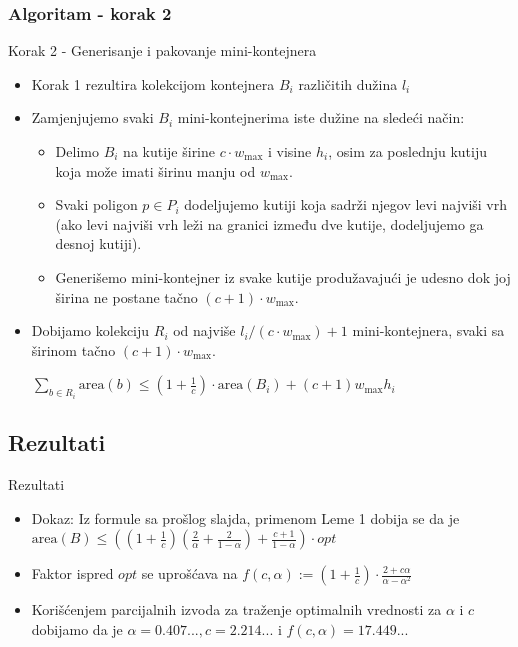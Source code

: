 \documentclass{beamer}
\theoremstyle{plain}
\newcommand{\thistheoremname}{}
\newtheorem{genericthm}[thm]{\thistheoremname}
\newenvironment{namedthm}[1]
  {\renewcommand{\thistheoremname}{#1}%
   \begin{genericthm}}
  {\end{genericthm}}
\begin{document}
\subsubsection{Algoritam - korak 2}
\begin{frame}{Korak 2 - Generisanje i pakovanje mini-kontejnera}
\begin{itemize}
    \item Korak 1 rezultira kolekcijom kontejnera $B_i$ različitih dužina $l_i$
    \item Zamjenjujemo svaki $B_i$ mini-kontejnerima iste dužine na sledeći način:
      \begin{itemize}
        \item Delimo $B_i$ na kutije širine $c \cdot w_{\text{max}}$ i visine $h_i$, osim za poslednju kutiju koja može imati širinu manju od $w_{\text{max}}$.
        \item Svaki poligon $p \in P_i$ dodeljujemo kutiji koja sadrži njegov levi najviši vrh (ako levi najviši vrh leži na granici između dve kutije, dodeljujemo ga desnoj kutiji).
        \item Generišemo mini-kontejner iz svake kutije produžavajući je udesno dok joj širina ne postane tačno $(c + 1) \cdot w_{\text{max}}$.
      \end{itemize}
    \item Dobijamo kolekciju $R_i$ od najviše $l_i / (c \cdot w_{\text{max}}) + 1$ mini-kontejnera, svaki sa širinom tačno $(c + 1) \cdot w_{\text{max}}$.
    \begin{center}
        $\sum_{b \in R_i} \text{area}(b) \leq (1 +  \frac{1}{c}) \cdot \text{area}(B_i) + (c + 1)  w_{\text{max}} h_i$
    \end{center} 
\end{itemize}
\end{frame}

\subsection{Rezultati}
\begin{frame}{Rezultati}
\begin{itemize}
    \begin{namedthm}{Teorema 1.}
        Neka je $P$ skup poligona na ravni sa ukupno n temena. Možemo spakovati $P$ u vremenu $O(nlogn)$ u pravougaoni kontejner $B$ takav da je $\text{area}(B) \leq 17.45 \cdot opt$, gde je $opt$ minimalna površina bilo kog pravougaonog kontejnera za $P$
    \end{namedthm}
    \item Dokaz: Iz formule sa prošlog slajda, primenom Leme 1 dobija se da je $\text{area}(B) \leq ((1+\frac{1}{c})(\frac{2}{\alpha}+\frac{2}{1-\alpha})+\frac{c+1}{1-\alpha}) \cdot opt$
    \item Faktor ispred $opt$ se uprošćava na $f(c,\alpha) := (1+\frac{1}{c}) \cdot \frac{2+c\alpha}{\alpha-\alpha^2}$
    \item Korišćenjem parcijalnih izvoda za traženje optimalnih vrednosti za $\alpha$ i $c$ dobijamo da je $\alpha=0.407...,c=2.214...$ i $f(c,\alpha)=17.449...$
\end{itemize}
\end{frame}
\end{document}
